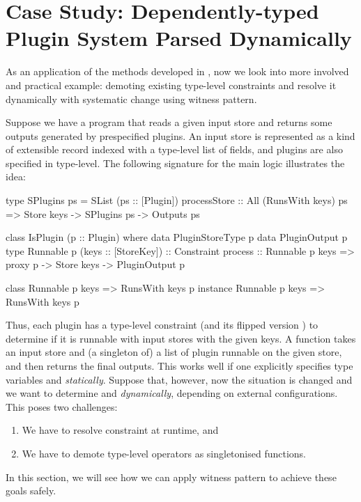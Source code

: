 \documentclass[demotion-paper.tex]{subfiles}
\begin{document}
\section{Case Study: Dependently-typed Plugin System Parsed Dynamically}
\label{sec:plugins}

As an application of the methods developed in , now we look into more involved and practical example: demoting existing type-level constraints and resolve it dynamically with systematic change using witness pattern.

Suppose we have a program that reads a given input store and returns some outputs generated by prespecified plugins.
An input store is represented as a kind of extensible record indexed with a type-level list of fields, and plugins are also specified in type-level.
The following signature for the main logic illustrates the idea:
\begin{code}
type SPlugins ps = SList (ps :: [Plugin])
processStore :: All (RunsWith keys) ps
             => Store keys -> SPlugins ps -> Outputs ps

class IsPlugin (p :: Plugin) where
  data PluginStoreType p
  data PluginOutput p
  type Runnable p (keys :: [StoreKey]) :: Constraint
  process :: Runnable p keys => proxy p -> Store keys -> PluginOutput p

class Runnable p keys => RunsWith keys p
instance Runnable p keys => RunsWith keys p
\end{code}
Thus, each plugin  has a type-level constraint  (and its flipped version ) to determine if it is runnable with input stores with the given keys.
A function  takes an input store and (a singleton of) a list of plugin runnable on the given store, and then returns the final outputs.
This works well if one explicitly specifies type variables  and  \emph{statically}.
Suppose that, however, now the situation is changed and we want to determine  and  \emph{dynamically}, depending on external configurations.
This poses two challenges:
\begin{enumerate}
  \item We have to resolve constraint  at runtime, and
  \item We have to demote type-level operators as singletonised functions.
\end{enumerate}
In this section, we will see how we can apply witness pattern to achieve these goals safely.
\end{document}
